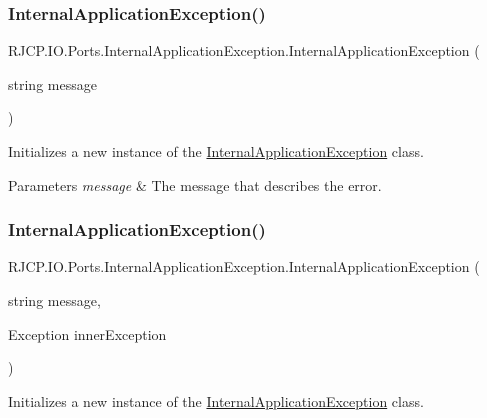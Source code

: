 \subsubsection{\texorpdfstring{InternalApplicationException()}{InternalApplicationException()}\hspace{0.1cm}{\footnotesize\ttfamily [2/3]}}
{\footnotesize\ttfamily R\+J\+C\+P.\+I\+O.\+Ports.\+Internal\+Application\+Exception.\+Internal\+Application\+Exception (\begin{DoxyParamCaption}\item[{string}]{message }\end{DoxyParamCaption})}



Initializes a new instance of the \mbox{\hyperlink{class_r_j_c_p_1_1_i_o_1_1_ports_1_1_internal_application_exception}{Internal\+Application\+Exception}} class. 


\begin{DoxyParams}{Parameters}
{\em message} & The message that describes the error.\\
\hline
\end{DoxyParams}
\mbox{\label{class_r_j_c_p_1_1_i_o_1_1_ports_1_1_internal_application_exception_a7118de55cabcf8d3fe296547ca93e528}} 
\subsubsection{\texorpdfstring{InternalApplicationException()}{InternalApplicationException()}\hspace{0.1cm}{\footnotesize\ttfamily [3/3]}}
{\footnotesize\ttfamily R\+J\+C\+P.\+I\+O.\+Ports.\+Internal\+Application\+Exception.\+Internal\+Application\+Exception (\begin{DoxyParamCaption}\item[{string}]{message,  }\item[{Exception}]{inner\+Exception }\end{DoxyParamCaption})}



Initializes a new instance of the \mbox{\hyperlink{class_r_j_c_p_1_1_i_o_1_1_ports_1_1_internal_application_exception}{Internal\+Application\+Exception}} class. 


